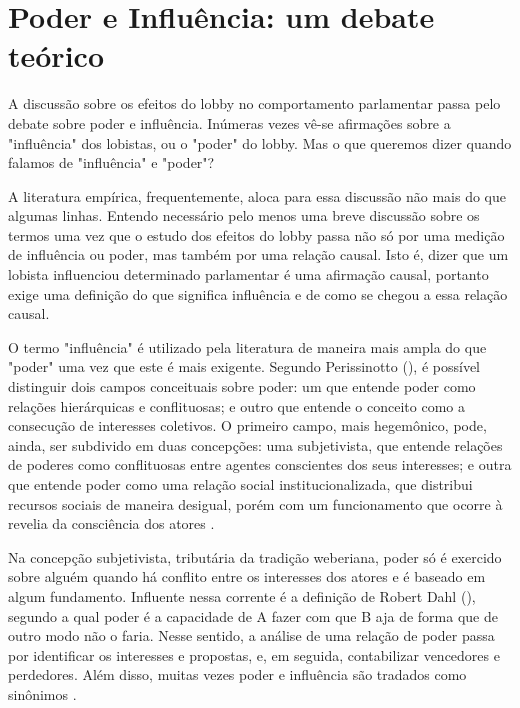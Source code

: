 \section{Poder e Influência: um debate teórico}
\label{section:poder_influe}

A discussão sobre os efeitos do lobby no comportamento parlamentar passa pelo debate sobre poder e influência. Inúmeras vezes vê-se afirmações sobre a "influência" dos lobistas, ou o "poder" do lobby. Mas o que queremos dizer quando falamos de "influência" e "poder"? 

A literatura empírica, frequentemente, aloca para essa discussão não mais do que algumas linhas. Entendo necessário pelo menos uma breve discussão sobre os termos uma vez que o estudo dos efeitos do lobby passa não só por uma medição de influência ou poder, mas também por uma relação causal. Isto é, dizer que um lobista influenciou determinado parlamentar é uma afirmação causal, portanto exige uma definição do que significa influência e de como se chegou a essa relação causal. 

O termo "influência" é utilizado pela literatura de maneira mais ampla do que "poder" uma vez que este é mais exigente. Segundo Perissinotto (\citeyear{perissinoto2008}), é possível distinguir dois campos conceituais sobre poder: um que entende poder como relações hierárquicas e conflituosas; e outro que entende o conceito como a consecução de interesses coletivos. O primeiro campo, mais hegemônico, pode, ainda, ser subdivido em duas concepções: uma subjetivista, que entende relações de poderes como conflituosas entre agentes conscientes dos seus interesses; e outra que entende poder como uma relação social institucionalizada, que distribui recursos sociais de maneira desigual, porém com um funcionamento que ocorre à revelia da consciência dos atores \cite{perissinoto2008}. 

Na concepção subjetivista, tributária da tradição weberiana, poder só é exercido sobre alguém quando há conflito entre os interesses dos atores e é baseado em algum fundamento. Influente nessa corrente é a definição de Robert Dahl (\citeyear{dahl2005governs}), segundo a qual poder é a capacidade de A fazer com que B aja de forma que de outro modo não o faria. Nesse sentido, a análise de uma relação de poder passa por identificar os interesses e propostas, e, em seguida, contabilizar vencedores e perdedores. Além disso, muitas vezes poder e influência são tradados como sinônimos \cite{lowery_lobbying_2013, simon_notes_1953}. 

